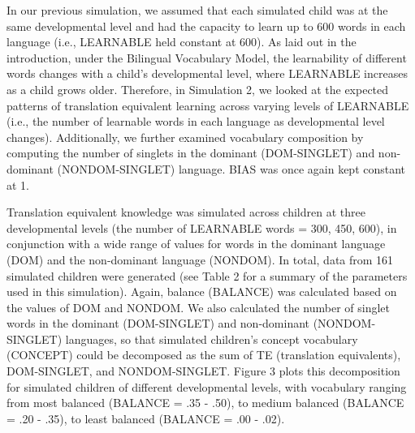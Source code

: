 \documentclass[
  english,
  ,man,floatsintext]{apa6}
\begin{document}
In our previous simulation, we assumed that each simulated child was at the same developmental level and had the capacity to learn up to 600 words in each language (i.e., LEARNABLE held constant at 600). As laid out in the introduction, under the Bilingual Vocabulary Model, the learnability of different words changes with a child's developmental level, where LEARNABLE increases as a child grows older. Therefore, in Simulation 2, we looked at the expected patterns of translation equivalent learning across varying levels of LEARNABLE (i.e., the number of learnable words in each language as developmental level changes). Additionally, we further examined vocabulary composition by computing the number of singlets in the dominant (DOM-SINGLET) and non-dominant (NONDOM-SINGLET) language. BIAS was once again kept constant at 1.

Translation equivalent knowledge was simulated across children at three developmental levels (the number of LEARNABLE words = 300, 450, 600), in conjunction with a wide range of values for words in the dominant language (DOM) and the non-dominant language (NONDOM). In total, data from 161 simulated children were generated (see Table 2 for a summary of the parameters used in this simulation). Again, balance (BALANCE) was calculated based on the values of DOM and NONDOM. We also calculated the number of singlet words in the dominant (DOM-SINGLET) and non-dominant (NONDOM-SINGLET) languages, so that simulated children's concept vocabulary (CONCEPT) could be decomposed as the sum of TE (translation equivalents), DOM-SINGLET, and NONDOM-SINGLET. Figure 3 plots this decomposition for simulated children of different developmental levels, with vocabulary ranging from most balanced (BALANCE = .35 - .50), to medium balanced (BALANCE = .20 - .35), to least balanced (BALANCE = .00 - .02).
\end{document}
